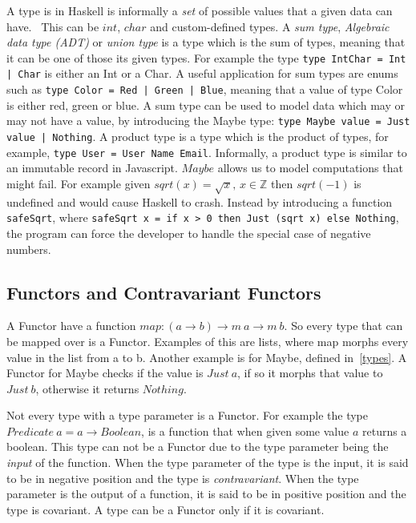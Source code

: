 A type is in Haskell is informally a \textit{set} of possible values that a
given data can have.~\cite{evantypesassets} This can be $int$, $char$ and
custom-defined types. A \textit{sum type}, \textit{Algebraic data type (ADT)}
or \textit{union type} is a type which is the sum of types, meaning that it can
be one of those its given types. For example the type \texttt{type IntChar =
Int | Char} is either an Int or a Char. A useful application for sum types are
enums such as \texttt{type Color = Red | Green | Blue}, meaning that a value of
type Color is either red, green or blue. A sum type can be used to model data
which may or may not have a value, by introducing the Maybe type: \texttt{type
Maybe value = Just value | Nothing}. A product type is a type which is the
product of types, for example, \texttt{type User = User Name Email}.
Informally, a product type is similar to an immutable record in Javascript.
$Maybe$ allows us to model computations that might fail. For example given
$sqrt(x) = \sqrt{x},\, x\in \mathbb{Z}$ then $sqrt(-1)$ is undefined and would
cause Haskell to crash.  Instead by introducing a function \texttt{safeSqrt},
where \texttt{safeSqrt x = if x > 0 then Just (sqrt x) else Nothing}, the
program can force the developer to handle the special case of negative numbers. 

\subsection{Functors and Contravariant Functors}

A Functor have a function $map : (a\rightarrow b) \rightarrow m\ a \rightarrow
m\ b$. So every type that can be mapped over is a Functor.  Examples of this are
lists, where map morphs every value in the list from a to b. Another example is
for Maybe, defined in~\ref{types}. A Functor for Maybe checks if the value is
$Just\ a$, if so it morphs that value to $Just\ b$, otherwise it returns
$Nothing$. 

Not every type with a type parameter is a Functor. For example the type
$Predicate\ a = a \rightarrow Boolean$, is a function that when given some value
$a$ returns a boolean. This type can not be a Functor due to the type parameter
being the \textit{input} of the function. When the type parameter of the type is
the input, it is said to be in negative position and the type is
\textit{contravariant}.  When the type parameter is the output of a function, it
is said to be in positive position and the type is covariant. A type can be a
Functor only if it is covariant.

